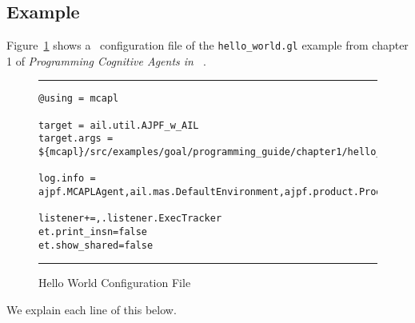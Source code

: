 \subsection{Example}
Figure~\ref{fig:goal:hello_world} shows a \jpf\ configuration file of the \texttt{hello\_world.gl} example from chapter 1 of \emph{Programming Cognitive Agents in \goal\ }.

\begin{figure}[htb]
\noindent\rule{\textwidth}{1pt}
\begin{small}
\begin{verbatim}
@using = mcapl

target = ail.util.AJPF_w_AIL
target.args = ${mcapl}/src/examples/goal/programming_guide/chapter1/hello_world.ail,${mcapl}/src/examples/goal/programming_guide/chapter1/simple.psl,1

log.info = ajpf.MCAPLAgent,ail.mas.DefaultEnvironment,ajpf.product.Product

listener+=,.listener.ExecTracker
et.print_insn=false
et.show_shared=false
\end{verbatim}
\end{small}
\rule{\textwidth}{1pt}
\caption{Hello World Configuration File}
\label{fig:goal:hello_world}
\end{figure}

We explain each line of this below.

